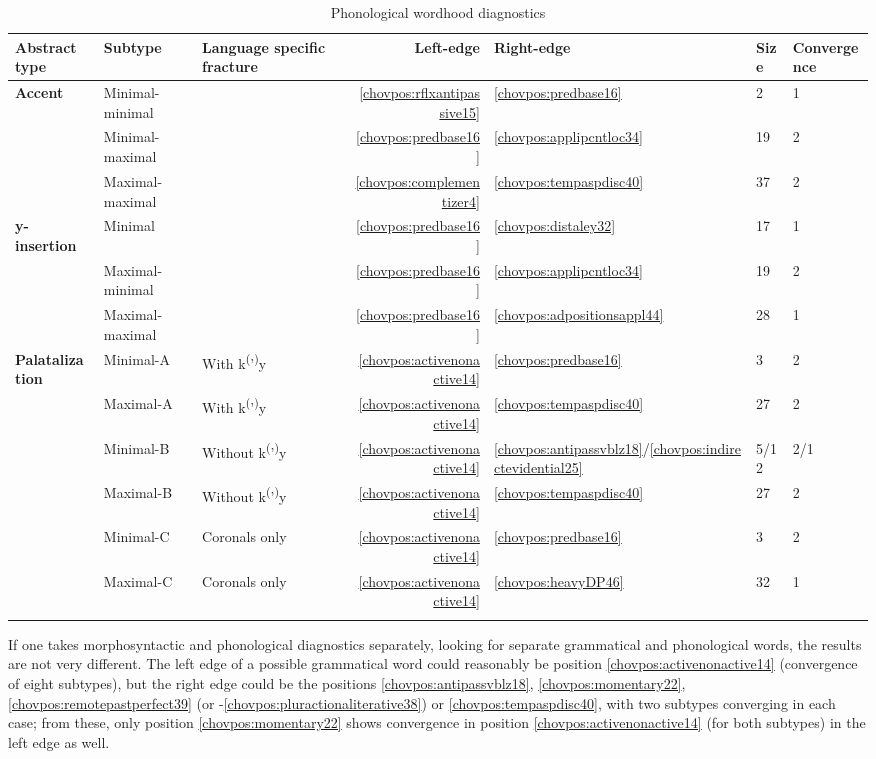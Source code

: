\documentclass[output=paper]{langscibook}
\begin{document}
\begin{sidewaystable}
    \caption{Phonological wordhood diagnostics}
    \label{tab:chor:key:5}
    \begin{tabularx}{\textwidth}{QQQrYYY}
         \lsptoprule
\textbf{Abstract} \textbf{type} & \textbf{Subtype} & \textbf{Language} \textbf{specific} \textbf{fracture} & \textbf{Left-edge} & \textbf{Right-edge} & \textbf{Size} & \textbf{Convergence}\\ \midrule
\textbf{Accent} & Minimal-minimal &  & \ref{chovpos:rflxantipassive15} & \ref{chovpos:predbase16} & 2 & 1\\
& Minimal-maximal &  & \ref{chovpos:predbase16} & \ref{chovpos:applipcntloc34} & 19 & 2\\
& Maximal-maximal &  & \ref{chovpos:complementizer4} & \ref{chovpos:tempaspdisc40} & 37 & 2\\
\textbf{y-insertion} & Minimal &  & \ref{chovpos:predbase16} & \ref{chovpos:distaley32} & 17 & 1\\
& Maximal-minimal &  & \ref{chovpos:predbase16} & \ref{chovpos:applipcntloc34} & 19 & 2\\
& Maximal-maximal &  & \ref{chovpos:predbase16} & \ref{chovpos:adpositionsappl44} & 28 & 1\\
\textbf{Palatalization} & Minimal-A & With k\textsuperscript{(}'\textsuperscript{)}y & \ref{chovpos:activenonactive14} & \ref{chovpos:predbase16} & 3 & 2\\
& Maximal-A & With k\textsuperscript{(}'\textsuperscript{)}y & \ref{chovpos:activenonactive14} & \ref{chovpos:tempaspdisc40} & 27 & 2\\
& Minimal-B & Without k\textsuperscript{(}'\textsuperscript{)}y & \ref{chovpos:activenonactive14} & \ref{chovpos:antipassvblz18}/\ref{chovpos:indirectevidential25} & 5/12 & 2/1\\
& Maximal-B & Without k\textsuperscript{(}'\textsuperscript{)}y & \ref{chovpos:activenonactive14} & \ref{chovpos:tempaspdisc40} & 27 & 2\\
& Minimal-C & Coronals only & \ref{chovpos:activenonactive14} & \ref{chovpos:predbase16} & 3 & 2\\
& Maximal-C & Coronals only & \ref{chovpos:activenonactive14} & \ref{chovpos:heavyDP46} & 32 & 1\\
\lspbottomrule
    \end{tabularx}
\end{sidewaystable}

If one takes morphosyntactic and phonological diagnostics separately, looking for separate grammatical and phonological words, the results are not very different. The left edge of a possible grammatical word could reasonably be position \ref{chovpos:activenonactive14} (convergence of eight subtypes), but the right edge could be the positions \ref{chovpos:antipassvblz18}, \ref{chovpos:momentary22}, \ref{chovpos:remotepastperfect39} (or -\ref{chovpos:pluractionaliterative38}) or \ref{chovpos:tempaspdisc40}, with two subtypes converging in each case; from these, only position \ref{chovpos:momentary22} shows convergence in position \ref{chovpos:activenonactive14} (for both subtypes) in the left edge as well.
\end{document}
